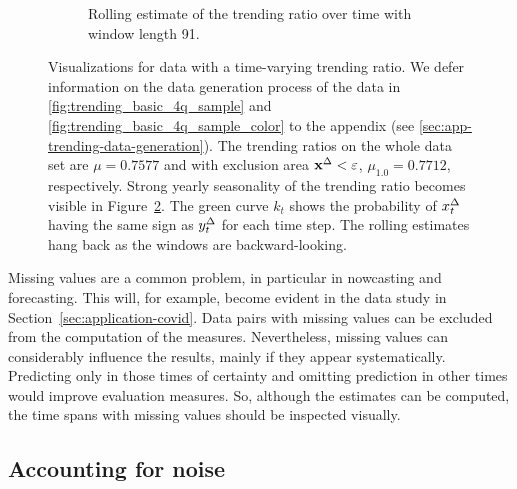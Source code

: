 \begin{figure}
\begin{subfigure}[t]{.48\textwidth}
    \caption{Rolling estimate of the trending ratio over time with window length 91. }\label{fig:trending_ratio_time_series}
    \end{subfigure}%
    \caption{Visualizations for data with a time-varying trending ratio. We defer information on the data generation process of the data in \ref{fig:trending_basic_4q_sample} and \ref{fig:trending_basic_4q_sample_color} to the appendix (see \ref{sec:app-trending-data-generation}). The trending ratios on the whole data set are $\mu = 0.7577$ and with exclusion area $\mathbf{x}^{\Delta} < \varepsilon$, $\mu_{1.0} = 0.7712$, respectively. Strong yearly seasonality of the trending ratio becomes visible in Figure~\ref{fig:trending_ratio_time_series}. The green curve $k_t$ shows the probability of $x^{\Delta}_t$ having the same sign as $y^{\Delta}_t$ for each time step. The rolling estimates hang back as the windows are backward-looking.}
\end{figure}

Missing values are a common problem, in particular in nowcasting and forecasting.
This will, for example, become evident in the data study in Section~\ref{sec:application-covid}.
Data pairs with missing values can be excluded from the computation of the measures.
Nevertheless, missing values can considerably influence the results, mainly if they appear systematically.
Predicting only in those times of certainty and omitting prediction in other times would improve evaluation measures.
So, although the estimates can be computed, the time spans with missing values should be inspected visually.


\subsection{Accounting for noise}\label{subsec:trending-noise}

